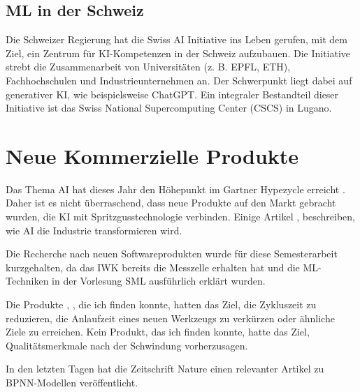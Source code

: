 
\subsection{ML in der Schweiz}
Die Schweizer Regierung hat die Swiss AI Initiative ins Leben gerufen, mit dem Ziel, ein Zentrum für KI-Kompetenzen in der Schweiz aufzubauen. Die Initiative strebt die Zusammenarbeit von Universitäten (z. B. EPFL, ETH), Fachhochschulen und Industrieunternehmen an. Der Schwerpunkt liegt dabei auf generativer KI, wie beispielsweise ChatGPT. Ein integraler Bestandteil dieser Initiative ist das Swiss National Supercomputing Center (CSCS) in Lugano. \cite{SwissAI}

\section{Neue Kommerzielle Produkte}
Das Thema AI hat dieses Jahr den Höhepunkt im Gartner Hypezycle erreicht \cite{hypecycle}. Daher ist es nicht überraschend, dass neue Produkte auf den Markt gebracht wurden, die KI mit Spritzgusstechnologie verbinden. Einige Artikel \cite{NewsP}, \cite{ieeeP} beschreiben, wie AI die Industrie transformieren wird.

Die Recherche nach neuen Softwareprodukten wurde für diese Semesterarbeit kurzgehalten, da das IWK bereits die Messzelle erhalten hat und die ML-Techniken in der Vorlesung SML ausführlich erklärt wurden.

Die Produkte \cite{katulu}, \cite{WH}, die ich finden konnte, hatten das Ziel, die Zykluszeit zu reduzieren, die Anlaufzeit eines neuen Werkzeugs zu verkürzen oder ähnliche Ziele zu erreichen. Kein Produkt, das ich finden konnte, hatte das Ziel, Qualitätsmerkmale nach der Schwindung vorherzusagen.

In den letzten Tagen hat die Zeitschrift Nature einen relevanter Artikel \cite{NatureP} zu BPNN-Modellen veröffentlicht.
